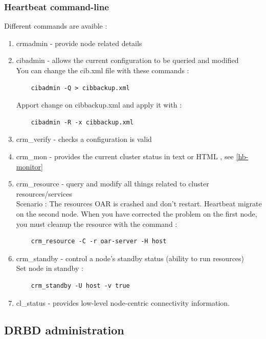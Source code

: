 \documentclass[a4paper,10pt]{report}
\begin{document}
\subsubsection{Heartbeat command-line}
Different commands are avaible : 
\begin{enumerate}
 \item crmadmin - provide node related details 
 \item cibadmin - allows the current configuration to be queried and modified \\
    You can change the cib.xml file with these commands :
    \begin{lstlisting}
    cibadmin -Q > cibbackup.xml 
    \end{lstlisting}
  Apport change on cibbackup.xml and apply it with :
    \begin{lstlisting}
    cibadmin -R -x cibbackup.xml 
    \end{lstlisting}

 \item crm\_verify - checks a configuration is valid 
 \item crm\_mon - provides the current cluster status in text or HTML , see \ref{hb-monitor}
 \item crm\_resource - query and modify all things related to cluster resources/services\\
    Scenario : The resources OAR is crashed and don't restart. Heartbeat migrate on the second node. When you have corrected the problem on the first node, you must cleanup the resource with the command :
    \begin{lstlisting}
    crm_resource -C -r oar-server -H host
    \end{lstlisting}
 \item crm\_standby - control a node's standby status (ability to run resources) \\
    Set node in standby :
    \begin{lstlisting}
    crm_standby -U host -v true 
    \end{lstlisting}
 \item cl\_status - provides low-level node-centric connectivity information. 
\end{enumerate}



\subsection{DRBD administration}
\end{document}
